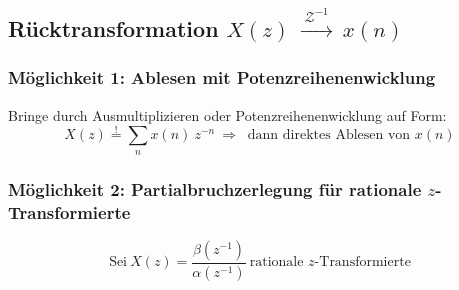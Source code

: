 \documentclass[10pt,a4paper]{article}
\newcommand{\invztransform}{
	~\xrightarrow{~\mathcal{Z}^{-1}~}~
}
\begin{document}
\begin{multicols}{2}
\end{multicols}

\subsection*{Rücktransformation $X(z) \invztransform x(n)$}
\subsubsection*{Möglichkeit 1: Ablesen mit Potenzreihenenwicklung}
Bringe durch Ausmultiplizieren oder Potenzreihenenwicklung auf Form:
\[
	X(z) \overset{!}{=} \sum_n x(n) ~ z^{-n} ~ \Rightarrow ~ \text{ dann direktes Ablesen von $x(n)$}
\]

\subsubsection*{Möglichkeit 2: Partialbruchzerlegung für rationale $z$-Transformierte}
\[
	\text{Sei} ~ X(z) = \frac{\beta(z^{-1})}{\alpha(z^{-1})} ~ \text{rationale $z$-Transformierte}
\]
\end{document}

